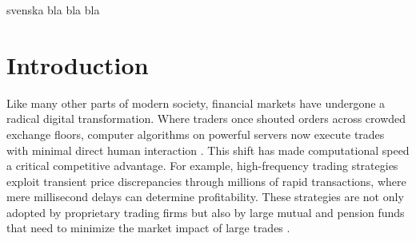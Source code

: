 \documentclass[english,12pt,a4paper,pdftex,sci,utf8]{aaltothesis}
\begin{document}
\newpage
%

\newpage
%
%
\begin{abstractpage}[swedish]
 svenska bla bla bla
\end{abstractpage}

\newpage



\thesistableofcontents




\cleardoublepage
\storeinipagenumber
{}
\setcounter{page}{1}


\section{Introduction}
\thispagestyle{empty}
Like many other parts of modern society, financial markets have undergone a radical digital transformation. Where traders once shouted orders across crowded exchange floors, computer algorithms on powerful servers now execute trades with minimal direct human interaction \cite{mcgowan2010rise, mackenzie2018material}. This shift has made computational speed a critical competitive advantage. For example, high-frequency trading strategies exploit transient price discrepancies through millions of rapid transactions, where mere millisecond delays can determine profitability. These strategies are not only adopted by proprietary trading firms but also by large mutual and pension funds that need to minimize the market impact of large trades \cite{mcgowan2010rise}.
\end{document}
